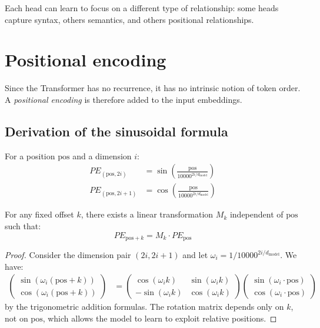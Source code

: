 \begin{remark}
Each head can learn to focus on a different type of relationship: some heads capture syntax, others semantics, and others positional relationships.
\end{remark}

\section{Positional encoding}
\label{sec:positional-encoding}

Since the Transformer has no recurrence, it has no intrinsic notion of token order. A \emph{positional encoding} is therefore added to the input embeddings.

\subsection{Derivation of the sinusoidal formula}

\begin{definition}
For a position $\text{pos}$ and a dimension $i$:
\begin{align}
PE_{(\text{pos}, 2i)} &= \sin\!\left(\frac{\text{pos}}{10000^{2i/d_{\text{model}}}}\right) \label{eq:pe-sin}\\
PE_{(\text{pos}, 2i+1)} &= \cos\!\left(\frac{\text{pos}}{10000^{2i/d_{\text{model}}}}\right) \label{eq:pe-cos}
\end{align}
\end{definition}

\begin{theorem}
For any fixed offset $k$, there exists a linear transformation $M_k$ independent of $\text{pos}$ such that:
\begin{equation}
PE_{\text{pos}+k} = M_k \cdot PE_{\text{pos}}
\end{equation}
\end{theorem}

\begin{proof}
Consider the dimension pair $(2i, 2i+1)$ and let $\omega_i = 1/10000^{2i/d_{\text{model}}}$. We have:
\begin{align}
\begin{pmatrix} \sin(\omega_i(\text{pos}+k)) \\ \cos(\omega_i(\text{pos}+k)) \end{pmatrix}
&= \begin{pmatrix} \cos(\omega_i k) & \sin(\omega_i k) \\ -\sin(\omega_i k) & \cos(\omega_i k) \end{pmatrix}
\begin{pmatrix} \sin(\omega_i \cdot \text{pos}) \\ \cos(\omega_i \cdot \text{pos}) \end{pmatrix}
\end{align}
by the trigonometric addition formulas. The rotation matrix depends only on $k$, not on $\text{pos}$, which allows the model to learn to exploit relative positions.
\end{proof}

